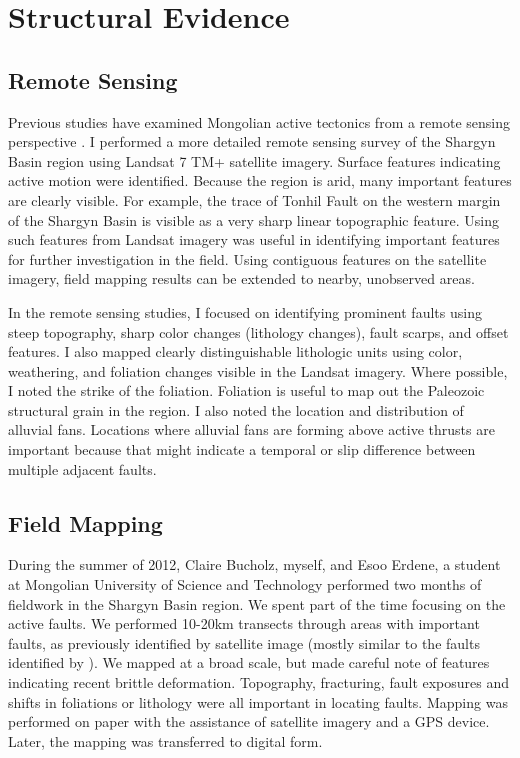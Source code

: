 \section{Structural Evidence}
\subsection{Remote Sensing}
Previous studies have examined Mongolian active tectonics from a remote sensing perspective \citep{Cunningham2005a}\citep{Cunningham2010}\citep{Tapponnier1979}\citep{Walker2007}. I performed a more detailed remote sensing survey of the Shargyn Basin region using Landsat 7 TM+ satellite imagery. Surface features indicating active motion were identified. Because the region is arid, many important features are clearly visible. For example, the trace of Tonhil Fault on the western margin of the Shargyn Basin is visible as a very sharp linear topographic feature. Using such features from Landsat imagery was useful in identifying important features for further investigation in the field. Using contiguous features on the satellite imagery, field mapping results can be extended to nearby, unobserved areas.

In the remote sensing studies, I focused on identifying prominent faults using steep topography, sharp color changes (lithology changes), fault scarps, and offset features. I also mapped clearly distinguishable lithologic units using color, weathering, and foliation changes visible in the Landsat imagery. Where possible, I noted the strike of the foliation. Foliation is useful to map out the Paleozoic structural grain in the region. I also noted the location and distribution of alluvial fans. Locations where alluvial fans are forming above active thrusts are important because that might indicate a temporal or slip difference between multiple adjacent faults.

\subsection{Field Mapping}
During the summer of 2012, Claire Bucholz, myself, and Esoo Erdene, a student at Mongolian University of Science and Technology performed two months of fieldwork in the Shargyn Basin region. We spent part of the time focusing on the active faults. We performed 10-20km transects through areas with important faults, as previously identified by satellite image (mostly similar to the faults identified by \citep{Walker2007}). We mapped at a broad scale, but made careful note of features indicating recent brittle deformation. Topography, fracturing, fault exposures and shifts in foliations or lithology were all important in locating faults.  Mapping was performed on paper with the assistance of satellite imagery and a GPS device. Later, the mapping was transferred to digital form.

